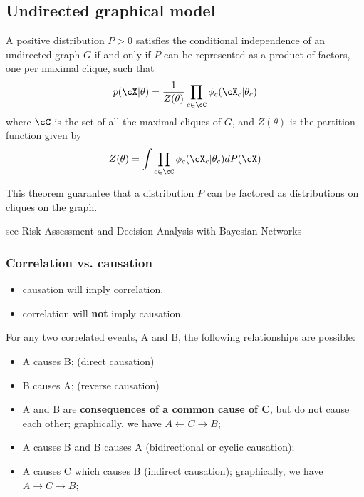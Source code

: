 \begin{refsection}
\subsection{Undirected graphical model}


\begin{theorem}
	A positive distribution $P >0$ satisfies the conditional independence of an undirected graph $G$ if and only if $P$ can be represented as a product of factors, one per maximal clique, such that
	$$p(\cX|\theta) = \frac{1}{Z(\theta)}\prod_{c\in \cC} \phi_c(\cX_c|\theta_c)$$
	where $\cC$ is the set of all the maximal cliques of $G$, and $Z(\theta)$ is the partition function given by 
	$$Z(\theta) = \int \prod_{c\in \cC}\phi_c(\cX_c|\theta_c) dP(\cX)$$
\end{theorem}


\begin{remark}
	This theorem guarantee that a distribution $P$ can be factored as distributions on cliques on the graph.
\end{remark}




see \cite{ankan2015mastering}
Risk Assessment and Decision Analysis with Bayesian Networks


\subsubsection{Correlation vs. causation}
\begin{remark}\hfill
	\begin{itemize}
		\item causation will imply correlation.
		\item correlation will \textbf{not} imply causation.
	\end{itemize}
	
For any two correlated events, A and B, the following relationships are possible:
\begin{itemize}
	\item A causes B; (direct causation)
	\item B causes A; (reverse causation)
	\item A and B are \textbf{consequences of a common cause of C}, but do not cause each other; graphically, we have $A\leftarrow C \rightarrow B$;
	\item A causes B and B causes A (bidirectional or cyclic causation);
	\item A causes C which causes B (indirect causation); graphically, we have $A\rightarrow C \rightarrow B$;
\end{itemize}	


\end{remark}
\end{refsection}
